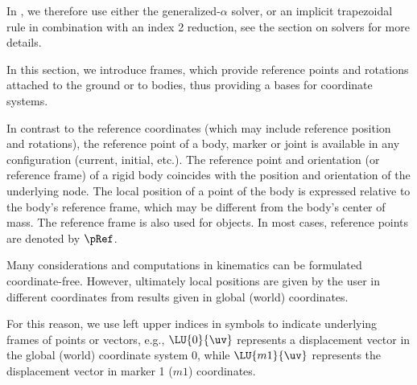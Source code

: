\noindent In \codeName, we therefore use either the generalized-$\alpha$ solver, or an implicit trapezoidal rule in combination with an index 2
reduction, see the section on solvers for more details.

In this section, we introduce frames, which provide reference points and rotations attached to the ground or to bodies, thus providing a bases for coordinate systems.

%
In contrast to the reference coordinates (which may include reference position and rotations), the reference point of a body, marker or joint is available in any configuration (current, initial, etc.). 
The reference point and orientation (or reference frame) of a rigid body coincides with the position and orientation of the underlying node.
The local position of a point of the body is expressed relative to the body's reference frame, which may be different from the body's center of mass.
%
The reference frame is also used for  objects. In most cases, reference points are denoted by $\pRef$.

%
Many considerations and computations in kinematics can be formulated coordinate-free.
However, ultimately local positions are given by the user in different coordinates from results given in global (world) coordinates.

For this reason, we use left upper indices in symbols to indicate underlying frames of points or vectors, e.g.,
$\LU{0}{\uv}$ represents a displacement vector in the global (world) coordinate system $0$, while 
$\LU{m1}{\uv}$ represents the displacement vector in marker 1 ($m1$) coordinates. 

